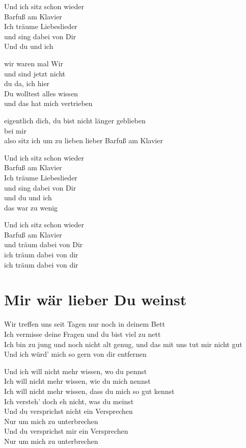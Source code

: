 \documentclass[]{book}
\begin{document}
Und ich sitz schon wieder\\
Barfuß am Klavier\\
Ich träume Liebeslieder\\
und sing dabei von Dir\\
Und du und ich

wir waren mal Wir\\
und sind jetzt nicht\\
du da, ich hier\\
Du wolltest alles wissen\\
und das hat mich vertrieben

eigentlich dich, du bist nicht länger geblieben\\
bei mir\\
also sitz ich um zu lieben lieber Barfuß am Klavier

Und ich sitz schon wieder\\
Barfuß am Klavier\\
Ich träume Liebeslieder\\
und sing dabei von Dir\\
und du und ich\\
das war zu wenig

Und ich sitz schon wieder\\
Barfuß am Klavier\\
und träum dabei von Dir\\
ich träum dabei von dir\\
ich träum dabei von dir

\hypertarget{mir-war-lieber-du-weinst-3}{%
\section{Mir wär lieber Du weinst}\label{mir-war-lieber-du-weinst-3}}

Wir treffen uns seit Tagen nur noch in deinem Bett\\
Ich vermisse deine Fragen und du bist viel zu nett\\
Ich bin zu jung und noch nicht alt genug, und das mit uns tut mir nicht gut\\
Und ich würd' mich so gern von dir entfernen

Und ich will nicht mehr wissen, wo du pennst\\
Ich will nicht mehr wissen, wie du mich nennst\\
Ich will nicht mehr wissen, dass du mich so gut kennst\\
Ich versteh' doch eh nicht, was du meinst\\
Und du versprichst nicht ein Versprechen\\
Nur um mich zu unterbrechen\\
Und du versprichst mir ein Versprechen\\
Nur um mich zu unterbrechen
\end{document}
